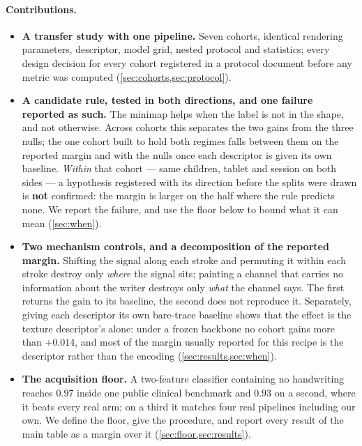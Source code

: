 \documentclass{article}
\begin{document}
\paragraph{Contributions.}
\begin{itemize}
\itemsep0em
\item \textbf{A transfer study with one pipeline.} Seven cohorts, identical rendering parameters,
descriptor, model grid, nested protocol and statistics; every design decision for every cohort
registered in a protocol document before any metric was computed
(\cref{sec:cohorts,sec:protocol}).

\item \textbf{A candidate rule, tested in both directions, and one failure reported as such.} The
minimap helps when the label is not in the shape, and not otherwise. Across cohorts this separates
the two gains from the three nulls; the one cohort built to hold both regimes falls between them on
the reported margin and with the nulls once each descriptor is given its own baseline.
\emph{Within} that cohort --- same children, tablet and session on both sides --- a
hypothesis registered with its direction before the splits were drawn is \textbf{not} confirmed:
the margin is larger on the half where the rule predicts none. We report the failure, and use the
floor below to bound what it can mean (\cref{sec:when}).

\item \textbf{Two mechanism controls, and a decomposition of the reported margin.} Shifting the
signal along each stroke and permuting it within each stroke destroy only \emph{where} the signal
sits; painting a channel that carries no information about the writer destroys only \emph{what} the
channel says. The first returns the gain to its baseline, the second does not reproduce it.
Separately, giving each descriptor its
own bare-trace baseline shows that the effect is the texture descriptor's alone: under a frozen
backbone no cohort gains more than $+0.014$, and most of the margin usually reported for this
recipe is the descriptor rather than the encoding (\cref{sec:results,sec:when}).

\item \textbf{The acquisition floor.} A two-feature classifier containing no handwriting reaches
$0.97$ inside one public clinical benchmark and $0.93$ on a second, where it beats every real arm;
on a third it matches four real pipelines including our own. We define the floor, give the
procedure, and report every result of the main table as a margin over it
(\cref{sec:floor,sec:results}).
\end{itemize}
\end{document}
